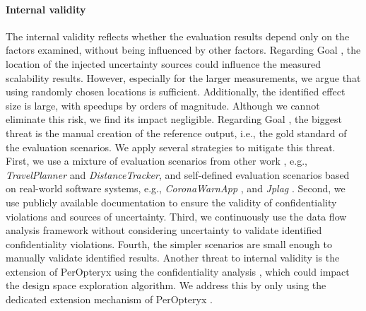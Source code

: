 \paragraph*{Internal validity}
The internal validity reflects whether the evaluation results depend only on the factors examined, without being influenced by other factors.
Regarding Goal , the location of the injected uncertainty sources could influence the measured scalability results.
However, especially for the larger measurements, we argue that using randomly chosen locations is sufficient.
Additionally, the identified effect size is large, with speedups by orders of magnitude.
Although we cannot eliminate this risk, we find its impact negligible.
Regarding Goal , the biggest threat is the manual creation of the reference output, i.e., the gold standard of the evaluation scenarios.
We apply several strategies to mitigate this threat.
First, we use a mixture of evaluation scenarios from other work \cite{seifermann_detecting_2022,seifermann_architectural_2022,katkalov_model-driven_2013,katkalov_modellgetriebener_2017,seifermann_data-driven_2019,rausch_common_2008}, e.g., \emph{TravelPlanner} and \emph{DistanceTracker}, and self-defined evaluation scenarios based on real-world software systems, e.g., \emph{CoronaWarnApp} \cite{robert_koch_institute_open-source_2020}, and \emph{Jplag} \cite{prechelt_finding_2002,saglam_jplag_2024}.
Second, we use publicly available documentation to ensure the validity of confidentiality violations and sources of uncertainty.
Third, we continuously use the data flow analysis framework without considering uncertainty to validate identified confidentiality violations.
Fourth, the simpler scenarios are small enough to manually validate identified results.
Another threat to internal validity is the extension of PerOpteryx \cite{koziolek_peropteryx_2011} using the confidentiality analysis \cite{walter_architectural_2022}, which could impact the design space exploration algorithm.
We address this by only using the dedicated extension mechanism of PerOpteryx \cite{koziolek_automated_2011}.


